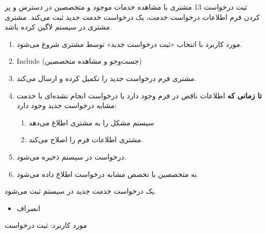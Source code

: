 {
\usecase
{ثبت درخواست}
{13}
{
	مشتری با مشاهده خدمات موجود و متخصصین در دسترس و پر کردن فرم اطلاعات درخواست خدمت، یک درخواست خدمت جدید ثبت می‌کند. 
}
{مشتری}
{}
{
	مشتری در سیستم لاگین کرده باشد.
}
{
	\vspace*{-0.6cm}
	\begin{enumerate}
		\item 
		مورد کاربرد با انتخاب «ثبت درخواست جدید» توسط مشتری شروع می‌شود.
		\item 
		Include (جست‌وجو و مشاهده متخصصین)
		\item 
		مشتری فرم درخواست جدید را تکمیل کرده و ارسال می‌کند.
				\item 
		\textbf{تا زمانی که}
		اطلاعات ناقص در فرم وجود دارد یا درخواست انجام نشده‌ای با خدمت مشابه درخواست جدید وجود دارد:
		\begin{enumerate}[label=\theenumi.\arabic*.]
						\item 
سیستم مشکل را به مشتری اطلاع می‌دهد
			\item 
			مشتری اطلاعات فرم را اصلاح می‌کند.
		\end{enumerate}
		\item 
		درخواست در سیستم ذخیره می‌شود.
		\item 
		به متخصصین با تخصص مشابه درخواست اطلاع داده می‌شود.
		
	\end{enumerate}
}
{یک درخواست خدمت جدید در سیستم ثبت می‌شود.}
{
	\begin{itemize}
		\vspace*{-0.6cm}
		\item انصراف
	\end{itemize}
}
{
	مورد کاربرد: ثبت درخواست
}


}








